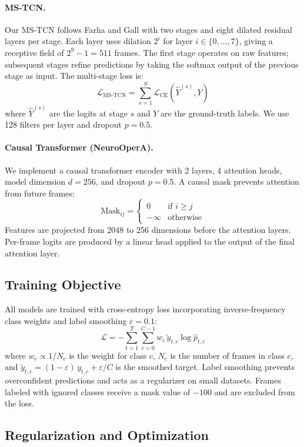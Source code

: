 \documentclass[10pt,twocolumn]{article}
\begin{document}
\paragraph{MS-TCN.} Our MS-TCN follows Farha and Gall \cite{farha2019mstcn} with two stages and eight dilated residual layers per stage. Each layer uses dilation $2^i$ for layer $i \in \{0,\ldots,7\}$, giving a receptive field of $2^9 - 1 = 511$ frames. The first stage operates on raw features; subsequent stages refine predictions by taking the softmax output of the previous stage as input. The multi-stage loss is:
\[
\mathcal{L}_\text{MS-TCN} = \sum_{s=1}^{S} \mathcal{L}_\text{CE}(\hat{Y}^{(s)}, Y)
\]
where $\hat{Y}^{(s)}$ are the logits at stage $s$ and $Y$ are the ground-truth labels. We use 128 filters per layer and dropout $p = 0.5$.

\paragraph{Causal Transformer (NeuroOperA).} We implement a causal transformer encoder with 2 layers, 4 attention heads, model dimension $d = 256$, and dropout $p = 0.5$. A causal mask prevents attention from future frames:
\[
\text{Mask}_{ij} = \begin{cases} 0 & \text{if } i \geq j \\ -\infty & \text{otherwise} \end{cases}
\]
Features are projected from 2048 to 256 dimensions before the attention layers. Per-frame logits are produced by a linear head applied to the output of the final attention layer.

\subsection{Training Objective}

All models are trained with cross-entropy loss incorporating inverse-frequency class weights and label smoothing $\varepsilon = 0.1$:
\[
\mathcal{L} = -\sum_{t=1}^{T} \sum_{c=0}^{C-1} w_c \, \tilde{y}_{t,c} \log \hat{p}_{t,c}
\]
where $w_c \propto 1/N_c$ is the weight for class $c$, $N_c$ is the number of frames in class $c$, and $\tilde{y}_{t,c} = (1 - \varepsilon)\, y_{t,c} + \varepsilon / C$ is the smoothed target. Label smoothing prevents overconfident predictions and acts as a regularizer on small datasets. Frames labeled with ignored classes receive a mask value of $-100$ and are excluded from the loss.

\subsection{Regularization and Optimization}
\end{document}

